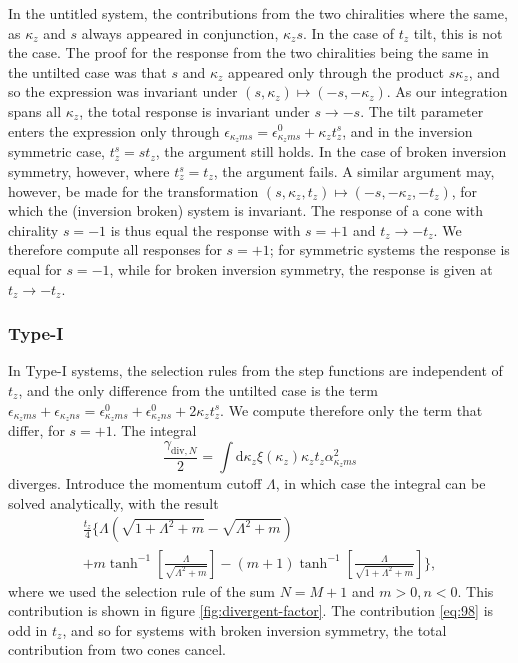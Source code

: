 In the untitled system, the contributions from the two chiralities where the same, as \( \kappa_z \) and \( s \) always appeared in conjunction, \( \kappa_z s \).
In the case of \( t_z \) tilt, this is not the case.
The proof for the response from the two chiralities being the same in the untilted case was that \( s \) and \( \kappa_z \) appeared only through the product \( s \kappa_z \), and so the expression was invariant under \( (s, \kappa_z) \mapsto (-s, -\kappa_z) \).
As our integration spans all \( \kappa_z \), the total response is invariant under \( s \to -s \).
The tilt parameter enters the expression only through \( \epsilon_{\kappa_z m s} = \epsilon_{\kappa_z m s}^0 + \kappa_z t^s_z \), and in the inversion symmetric case, \( t^s_z = s t_z \), the argument still holds.
In the case of broken inversion symmetry, however, where \( t^s_z = t_z \), the argument fails.
A similar argument may, however, be made for the transformation \( (s, \kappa_z, t_z) \mapsto (-s, -\kappa_z, -t_z) \), for which the (inversion broken) system is invariant.
The response of a cone with chirality \( s = -1 \) is thus equal the response with \( s = +1 \) and \( t_z \to -t_z \).
We therefore compute all responses for \( s=+1 \);
for symmetric systems the response is equal for \( s=-1 \), while for broken inversion symmetry, the response is given at \( t_z \to -t_z \).

\subsubsection{Type-I}
In Type-I systems, the selection rules from the step functions are independent of \( t_z \), and the only difference from the untilted case is the term \( \epsilon_{\kappa_z m s} + \epsilon_{\kappa_z n s} = \epsilon^0_{\kappa_z m s} + \epsilon^0_{\kappa_z n s} + 2 \kappa_z t^s_z \).
We compute therefore only the term that differ, for \( s=+1 \).
The integral
\begin{equation}
  \label{eq:97}
  \frac{\gamma_{\text{div}, N}}{2} = \int \mathrm{d}\kappa_z \xi(\kappa_z) \kappa_z t_z \alpha_{\kappa_z m s}^2
\end{equation}
diverges.
Introduce the momentum cutoff \( \Lambda \), in which case the integral can be solved analytically, with the result
\begin{multline}
  \frac{t_z}{4}
  \Bigg\{
    \Lambda\left(\sqrt{1 + \Lambda^2 + m} - \sqrt{\Lambda^2 + m}  \right)\\
    + m \tanh^{-1}\left[\frac{\Lambda}{\sqrt{\Lambda^2 + m} } \right]
    - (m+1) \tanh^{-1}\left[\frac{\Lambda}{\sqrt{1 + \Lambda^2 + m }}\right]
    \Bigg\},
    \label{eq:98}
\end{multline}
where we used the selection rule of the sum \( N=M+1 \) and \( m>0, n<0 \).
This contribution is shown in figure \ref{fig:divergent-factor}.
The contribution \eqref{eq:98} is odd in \( t_z \), and so for systems with broken inversion symmetry, the total contribution from two cones cancel.



